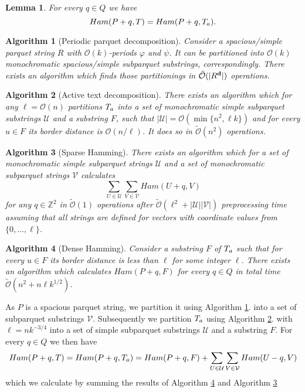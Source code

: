 \documentclass[a4paper]{article}
\newcommand{\Z}{\mathbb{Z}}
\renewcommand{\O}{\mathcal{O}}
\newcommand{\tO}{\tilde{\mathcal{O}}}
\renewcommand{\phi}{\varphi}
\newcommand{\set}[1]{\lbrace #1 \rbrace}
\newtheorem{algorithm}{Algorithm}
\newtheorem{lemma}{Lemma}[definition]
\begin{document}
\begin{lemma}
	For every $q \in Q$ we have
	$$Ham(P + q, T) = Ham(P + q, T_a).$$
\end{lemma}


\begin{algorithm}[Periodic parquet decomposition]
	\label{parquet_decomposition}
	Consider a spacious/simple parquet string $R$ with $\O(k)$-periods $\phi$ and $\psi$.
	It can be partitioned into $\O(k)$ monochromatic spacious/simple subparquet substrings, correspondingly.
	There exists an algorithm which finds those partitionings in $\tO(|\d{R}|)$ operations.
\end{algorithm}


\newcommand{\T}{\mathcal{T}}
\renewcommand{\S}{\mathcal{S}}
\renewcommand{\P}{\mathcal{P}}
\newcommand{\U}{\mathcal{U}}
\newcommand{\V}{\mathcal{V}}
\newcommand{\F}{\mathcal{F}}

\begin{algorithm}[Active text decomposition]
	\label{text_decomposition}
	There exists an algorithm which for any $\ell = \O(n)$ partitions $T_a$ into a set of monochromatic simple subparquet substrings $\U$ and a substring $F$,
	such that $|\U| = \O(\min\set{n^2, \ell k})$ and for every $u \in F$ its border distance is $\O(n / \ell)$.
	It does so in $\tO(n^2)$ operations.
\end{algorithm}


\begin{algorithm}[Sparse Hamming]
	\label{sparse_algo}
	There exists an algorithm which for a set of monochromatic simple subparquet strings $\U$ and a set of monochromatic subparquet strings $\V$ calculates 
	$$ \sum_{U \in \U}\sum_{V \in \V} Ham(U + q, V) $$
	for any $q \in \Z^2 $ in $\tO(1)$ operations after $\tO(\ell^2 + |\U||\V|)$ preprocessing time assuming that all strings are defined for vectors with coordinate values from $\set{0, \dots, \ell}$.
\end{algorithm}


\begin{algorithm}[Dense Hamming]
	\label{dense_algo}
	Consider a substring $F$ of $T_a$ such that for every $u \in F$ its border distance is less than $\ell$ for some integer $\ell$.
	There exists an algorithm which calculates $Ham(P + q, F)$ for every $q \in Q$ in total time $\tO(n^2 + n \ell k^{1/2})$.
\end{algorithm}


As $P$ is a spacious parquet string, we partition it using Algorithm \ref{parquet_decomposition}. into a set of subparquet substrings $\V$.
Subsequently we partition $T_a$ using Algorithm \ref{text_decomposition}. with $\ell = nk^{-3/4}$ into a set of simple subparquet substrings $\U$ and a substring $F$.
For every $q \in Q$ we then have
$$ Ham(P + q, T) = Ham(P + q, \Ta) = Ham(P + q, F) + \sum_{U \in \U}\sum_{V \in \V} Ham(U - q, V) $$
which we calculate by summing the results of Algorithm \ref{dense_algo} and Algorithm \ref{sparse_algo}
\end{document}
